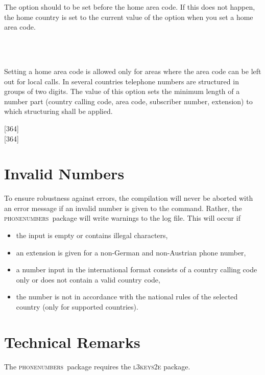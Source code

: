 \documentclass[numbers=noenddot]{scrreprt}
\newcommand*\Paket[1]{\textsc{#1}}
\newcommand\phone{\textcolor{cnltx}{\Paket{phone\-numbers}}}
\newcommand\UeberschriftUngueltig{\section{Invalid Numbers}}
\begin{document}
\begin{Befehlsliste}
The  option should to be set before the home area code. If this does not happen, the home country is set to the current value of the  option when you set a home area code.
\begin{sidebyside}
   \\
   \\
\end{sidebyside}
Setting a home area code is allowed only for areas where the area code can be left out for local calls.
In several countries telephone numbers are structured in groups of two digits. The value of this option sets the minimum length of a number part (country calling code, area code, subscriber number, extension) to which structuring shall be applied.
\begin{sidebyside}
  [364] \\
  [364]
\end{sidebyside}
\end{Befehlsliste}

\UeberschriftUngueltig
To ensure robustness against errors, the compilation will never be aborted with an error message if an invalid number is given to the  command. Rather, the \phone\ package will write warnings to the log file.
This will occur if
\begin{itemize}
\item the input is empty or contains illegal characters,
\item an extension is given for a non-German and non-Austrian phone number,
\item a number input in the international format consists of a country calling code only or does not contain a valid country code,
\item the number is not in accordance with the national rules of the selected country (only for supported countries).
\end{itemize}

\section{Technical Remarks}
The \phone\ package requires the
\Paket{l3keys2e}
package.
\end{document}
